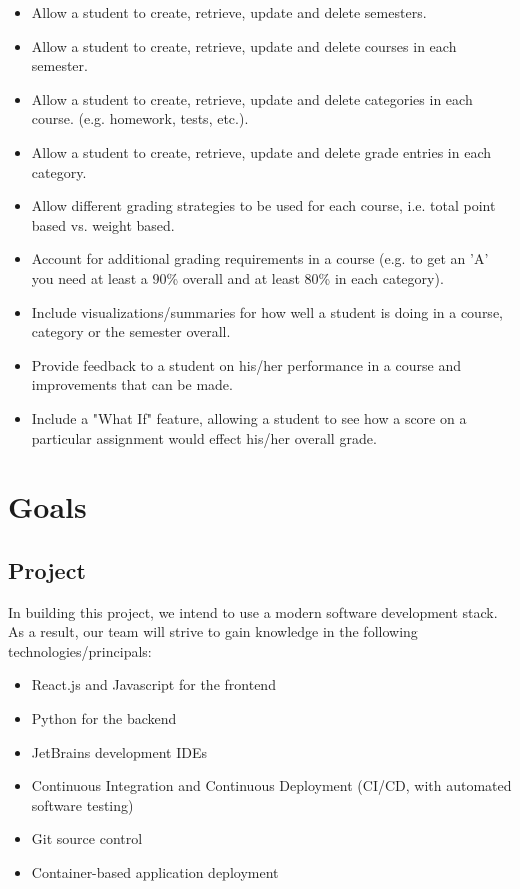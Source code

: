 \documentclass[12pt]{article}
\begin{document}
\begin{itemize}
    \item Allow a student to create, retrieve, update and delete semesters.
    \item Allow a student to create, retrieve, update and delete courses in each semester.
    \item Allow a student to create, retrieve, update and delete categories in each course. (e.g.
    homework, tests, etc.).
    \item Allow a student to create, retrieve, update and delete grade entries in each category.
    \item Allow different grading strategies to be used for each course, i.e. total point based vs.
    weight based.
    \item Account for additional grading requirements in a course (e.g. to get an 'A' you need at
    least a 90\% overall and at least 80\% in each category).
    \item Include visualizations/summaries for how well a student is doing in a course, category or
    the semester overall.
    \item Provide feedback to a student on his/her performance in a course and improvements that
    can be made.
    \item Include a "What If" feature, allowing a student to see how a score on a particular
    assignment would effect his/her overall grade.
\end{itemize}

\section{Goals}
\subsection{Project}
In building this project, we intend to use a modern software development stack. As a result, our
team will strive to gain knowledge in the following technologies/principals:

\begin{itemize}
    \item React.js and Javascript for the frontend
    \item Python for the backend
    \item JetBrains development IDEs
    \item Continuous Integration and Continuous Deployment (CI/CD, with automated software testing)
    \item Git source control
    \item Container-based application deployment
\end{itemize}
\end{document}
